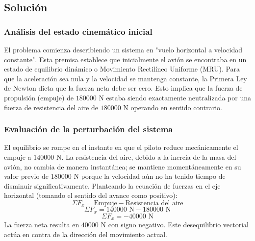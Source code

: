 \documentclass[12pt, a4paper]{article}
\begin{document}
\begin{center}
\end{center}

\subsection*{Solución}

\subsubsection*{Análisis del estado cinemático inicial}
El problema comienza describiendo un sistema en "vuelo horizontal a velocidad constante". Esta premisa establece que inicialmente el avión se encontraba en un estado de equilibrio dinámico o Movimiento Rectilíneo Uniforme (MRU). Para que la aceleración sea nula y la velocidad se mantenga constante, la Primera Ley de Newton dicta que la fuerza neta debe ser cero. Esto implica que la fuerza de propulsión (empuje) de $180000 \text{ N}$ estaba siendo exactamente neutralizada por una fuerza de resistencia del aire de $180000 \text{ N}$ operando en sentido contrario.

\subsubsection*{Evaluación de la perturbación del sistema}
El equilibrio se rompe en el instante en que el piloto reduce mecánicamente el empuje a $140000 \text{ N}$. La resistencia del aire, debido a la inercia de la masa del avión, no cambia de manera instantánea; se mantiene momentáneamente en su valor previo de $180000 \text{ N}$ porque la velocidad aún no ha tenido tiempo de disminuir significativamente. 
Planteando la ecuación de fuerzas en el eje horizontal (tomando el sentido del avance como positivo):
$$\Sigma F_x = \text{Empuje} - \text{Resistencia del aire}$$
$$\Sigma F_x = 140000 \text{ N} - 180000 \text{ N}$$
$$\Sigma F_x = -40000 \text{ N}$$
La fuerza neta resulta en $40000 \text{ N}$ con signo negativo. Este desequilibrio vectorial actúa en contra de la dirección del movimiento actual.
\end{document}
